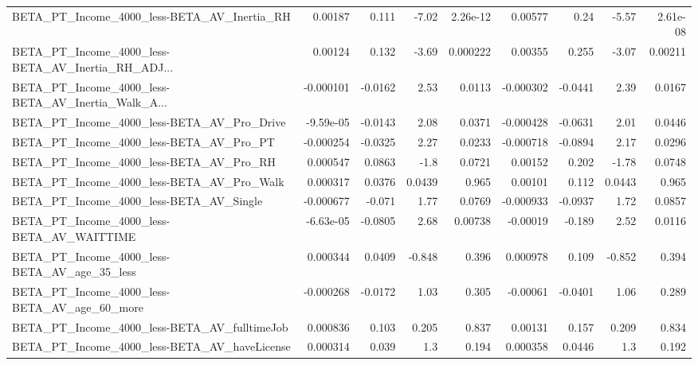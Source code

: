 \begin{tabular}{lrrrrrrrr}
BETA\_PT\_Income\_4000\_less-BETA\_AV\_Inertia\_RH        &     0.00187 &        0.111 &    -7.02 & 2.26e-12 &    0.00577 &        0.24 &        -5.57 &      2.61e-08 \\
BETA\_PT\_Income\_4000\_less-BETA\_AV\_Inertia\_RH\_ADJ... &     0.00124 &        0.132 &    -3.69 & 0.000222 &    0.00355 &       0.255 &        -3.07 &       0.00211 \\
BETA\_PT\_Income\_4000\_less-BETA\_AV\_Inertia\_Walk\_A... &   -0.000101 &      -0.0162 &     2.53 &   0.0113 &  -0.000302 &     -0.0441 &         2.39 &        0.0167 \\
BETA\_PT\_Income\_4000\_less-BETA\_AV\_Pro\_Drive         &   -9.59e-05 &      -0.0143 &     2.08 &   0.0371 &  -0.000428 &     -0.0631 &         2.01 &        0.0446 \\
BETA\_PT\_Income\_4000\_less-BETA\_AV\_Pro\_PT            &   -0.000254 &      -0.0325 &     2.27 &   0.0233 &  -0.000718 &     -0.0894 &         2.17 &        0.0296 \\
BETA\_PT\_Income\_4000\_less-BETA\_AV\_Pro\_RH            &    0.000547 &       0.0863 &     -1.8 &   0.0721 &    0.00152 &       0.202 &        -1.78 &        0.0748 \\
BETA\_PT\_Income\_4000\_less-BETA\_AV\_Pro\_Walk          &    0.000317 &       0.0376 &   0.0439 &    0.965 &    0.00101 &       0.112 &       0.0443 &         0.965 \\
BETA\_PT\_Income\_4000\_less-BETA\_AV\_Single            &   -0.000677 &       -0.071 &     1.77 &   0.0769 &  -0.000933 &     -0.0937 &         1.72 &        0.0857 \\
BETA\_PT\_Income\_4000\_less-BETA\_AV\_WAITTIME          &   -6.63e-05 &      -0.0805 &     2.68 &  0.00738 &   -0.00019 &      -0.189 &         2.52 &        0.0116 \\
BETA\_PT\_Income\_4000\_less-BETA\_AV\_age\_35\_less       &    0.000344 &       0.0409 &   -0.848 &    0.396 &   0.000978 &       0.109 &       -0.852 &         0.394 \\
BETA\_PT\_Income\_4000\_less-BETA\_AV\_age\_60\_more       &   -0.000268 &      -0.0172 &     1.03 &    0.305 &   -0.00061 &     -0.0401 &         1.06 &         0.289 \\
BETA\_PT\_Income\_4000\_less-BETA\_AV\_fulltimeJob       &    0.000836 &        0.103 &    0.205 &    0.837 &    0.00131 &       0.157 &        0.209 &         0.834 \\
BETA\_PT\_Income\_4000\_less-BETA\_AV\_haveLicense       &    0.000314 &        0.039 &      1.3 &    0.194 &   0.000358 &      0.0446 &          1.3 &         0.192 \\

\end{tabular}
